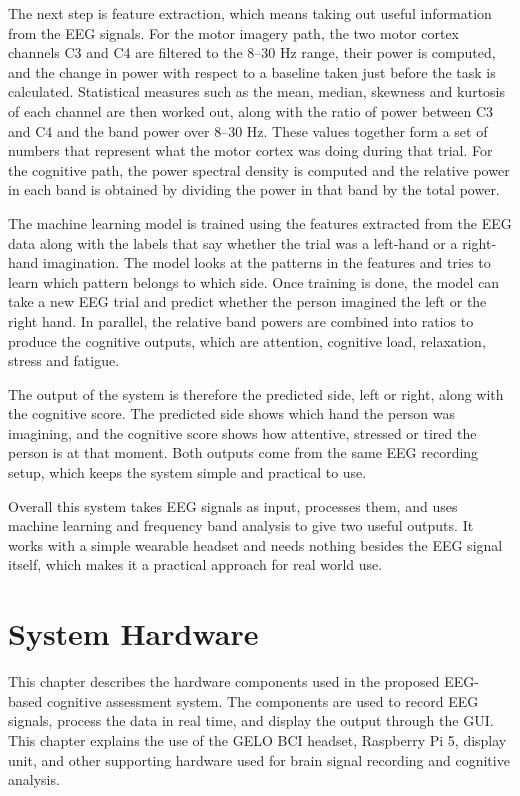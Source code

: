 The next step is feature extraction, which means taking out useful information from the
EEG signals. For the motor imagery path, the two motor cortex channels C3 and C4 are
filtered to the 8--30 Hz range, their power is computed, and the change in power with
respect to a baseline taken just before the task is calculated. Statistical measures such
as the mean, median, skewness and kurtosis of each channel are then worked out, along with
the ratio of power between C3 and C4 and the band power over 8--30 Hz. These values
together form a set of numbers that represent what the motor cortex was doing during that
trial. For the cognitive path, the power spectral density is computed and the relative
power in each band is obtained by dividing the power in that band by the total power.

The machine learning model is trained using the features extracted from the EEG data along
with the labels that say whether the trial was a left-hand or a right-hand imagination. The
model looks at the patterns in the features and tries to learn which pattern belongs to
which side. Once training is done, the model can take a new EEG trial and predict whether
the person imagined the left or the right hand. In parallel, the relative band powers are
combined into ratios to produce the cognitive outputs, which are attention, cognitive load,
relaxation, stress and fatigue.

The output of the system is therefore the predicted side, left or right, along with the
cognitive score. The predicted side shows which hand the person was imagining, and the
cognitive score shows how attentive, stressed or tired the person is at that moment. Both
outputs come from the same EEG recording setup, which keeps the system simple and practical
to use.

Overall this system takes EEG signals as input, processes them, and uses machine learning
and frequency band analysis to give two useful outputs. It works with a simple wearable
headset and needs nothing besides the EEG signal itself, which makes it a practical
approach for real world use.


\chapter{System Hardware}
This chapter describes the hardware components used in the proposed EEG-based cognitive
assessment system. The components are used to record EEG signals, process the data in real
time, and display the output through the GUI. This chapter explains the use of the GELO BCI
headset, Raspberry Pi 5, display unit, and other supporting hardware used for brain signal
recording and cognitive analysis.

